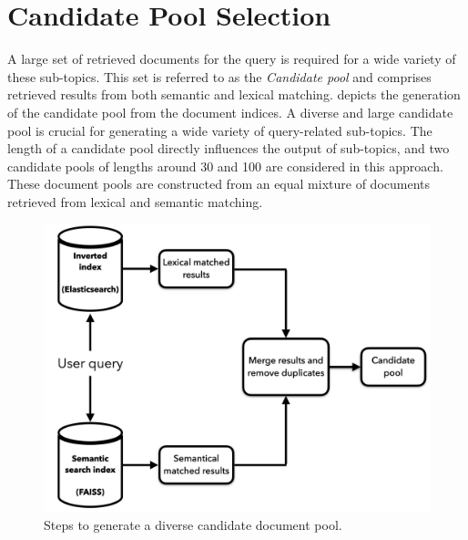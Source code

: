 \section{Candidate Pool Selection}


A large set of retrieved documents for the query is required for a wide variety of these sub-topics. This set is referred to as the \emph{Candidate pool} and comprises retrieved results from both semantic and lexical matching.  depicts the generation of the candidate pool from the document indices. A diverse and large candidate pool is crucial for generating a wide variety of query-related sub-topics. The length of a candidate pool directly influences the output of sub-topics, and two candidate pools of lengths around 30 and 100 are considered in this approach. These document pools are constructed from an equal mixture of documents retrieved from lexical and semantic matching.


\begin{figure}[h]
	\centering
	\includegraphics[width=.8\textwidth]{images/thesis_images/candidate_pool.png}
	\caption{Steps to generate a diverse candidate document pool.  \label{fig:candidate_pool}}
\end{figure}

